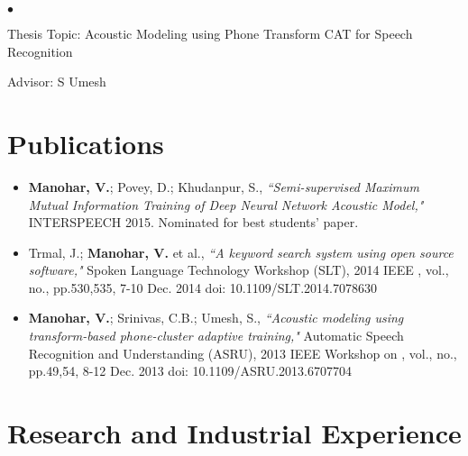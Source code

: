 \documentclass[margin,line,pifont,palatino,courier]{res}
\newenvironment{list1}{
  \begin{list}{\ding{113}}{%
      \setlength{\itemsep}{0in}
      \setlength{\parsep}{0in} \setlength{\parskip}{0in}
      \setlength{\topsep}{0in} \setlength{\partopsep}{0in}
      \setlength{\leftmargin}{0.17in}}}{\end{list}}
\newenvironment{list2}{
  \begin{list}{$\bullet$}{%
      \setlength{\itemsep}{0in}
      \setlength{\parsep}{0in} \setlength{\parskip}{0in}
      \setlength{\topsep}{0in} \setlength{\partopsep}{0in}
      \setlength{\leftmargin}{0.2in}}}{\end{list}}
\begin{document}
\begin{resume}
\begin{list1}
\begin{list2}
\vspace*{.05in}
\item Thesis Topic: Acoustic Modeling using Phone Transform CAT for Speech Recognition
\item Advisor: S Umesh
\end{list2}
\end{list1}

\section{\sc Publications}
\begin{itemize}
  \item 
    \textbf{Manohar, V.}; Povey, D.; Khudanpur, S., 
    \textit{``Semi-supervised Maximum Mutual Information Training of Deep Neural
    Network Acoustic Model,"}
    INTERSPEECH 2015. Nominated for best students' paper.
  \item
    Trmal, J.; \textbf{Manohar, V.} et al., 
    \textit{``A keyword search system using open source software," } 
    Spoken Language Technology Workshop (SLT), 2014 IEEE , vol., no., pp.530,535, 7-10 Dec. 2014
    doi: 10.1109/SLT.2014.7078630 
  \item
    \textbf{Manohar, V.}; Srinivas, C.B.; Umesh, S., 
    \textit{``Acoustic modeling
    using transform-based phone-cluster adaptive training,"} 
    Automatic Speech Recognition and Understanding (ASRU), 2013 IEEE Workshop on
    , vol., no., pp.49,54, 8-12 Dec. 2013 doi: 10.1109/ASRU.2013.6707704
\end{itemize}
\section{\sc Research and Industrial Experience}

\begin{longtable}{@{}p{1.2in}p{3.8in}}


\end{longtable}
\end{resume}
\end{document}
